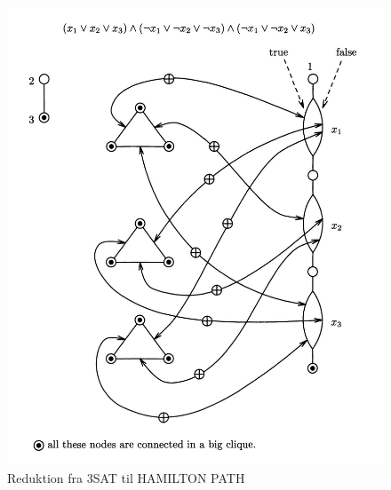 \begin{figure}[H]
  \centering
  \includegraphics[width=\linewidth]{img/hamil_example}
  \caption{Reduktion fra 3SAT til HAMILTON PATH\label{fig:hamil-example}}
\end{figure}

\newpage
